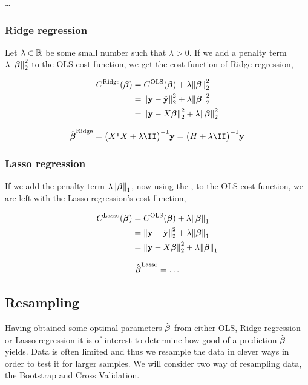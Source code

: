 \dots



\subsubsection{Ridge regression}\label{sec:Ridge}

Let $\lambda \in \mathbb{R}^{}$ be some small number such that $\lambda >0$. If we add a penalty term $\lambda \norm{\boldsymbol{\beta}}_2^2$ to the OLS cost function, we get the cost function of Ridge regression,

\begin{align*}
    C^\text{Ridge}(\boldsymbol{\beta}) &=  C^\text{OLS}(\boldsymbol{\beta}) + \lambda \norm{\boldsymbol{\beta}}_2^2 \\
    &=\norm{\mathbf{y}-\tilde{\mathbf{y}}}_2^{2}  + \lambda \norm{\boldsymbol{\beta}}_2^2 \\
    &= \norm{\mathbf{y}-X\boldsymbol{\beta}}_2^{2} + \lambda \norm{\boldsymbol{\beta}}_2^2 
\end{align*}

\begin{align*}
    \optbeta^\text{Ridge} = \big(\hessian + \lambda \II\big)^{-1} \vec{y} = \big(H + \lambda \II\big)^{-1} \vec{y}
\end{align*}


\subsubsection{Lasso regression}\label{sec:Lasso}

If we add the penalty term $\lambda \norm{\boldsymbol{\beta}}_1$, now using the \footnotemark, to the OLS cost function, we are left with the Lasso regression's cost function,

\begin{align*}
    C^\text{Lasso}(\boldsymbol{\beta})  &= C^\text{OLS}(\boldsymbol{\beta}) + \lambda \norm{\boldsymbol{\beta}}_1 \\
    &= \norm{\mathbf{y}-\tilde{\mathbf{y}}}_2^{2}  + \lambda \norm{\boldsymbol{\beta}}_{1} \\
    &= \norm{\mathbf{y}-X\boldsymbol{\beta}}_2^{2} + \lambda \norm{\boldsymbol{\beta}}_{1}
\end{align*}

\begin{align*}
    \hat{\boldsymbol{\beta}}^\text{Lasso} = \dots
\end{align*}

\subsection{Resampling}\label{sec:resampling}
Having obtained some optimal parameters $\hat{\boldsymbol{\beta}}$ from either OLS, Ridge regression or Lasso regression it is of interest to determine how good of a prediction $\hat{\boldsymbol{\beta}}$ yields. Data is often limited and thus we resample the data in clever ways in order to test it for larger samples. We will consider two way of resampling data, the Bootstrap and Cross Validation. 

